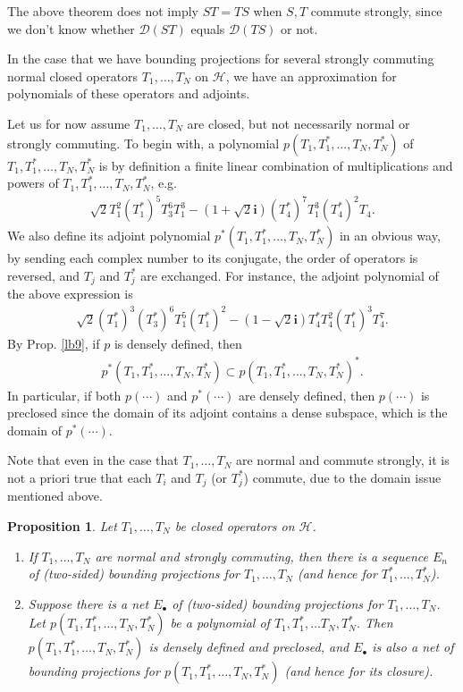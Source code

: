\documentclass[12pt,a4paper,notitlepage]{article}
\theoremstyle{definition}
\theoremstyle{plain}
\newtheorem{pp}[df]{Proposition}
\newcommand{\mc}{\mathcal}
\newcommand{\Dom}{\scr D}
\newcommand{\scr}{\mathscr}
\newcommand{\im}{\mathbf{i}}
\newcommand{\blt}{\bullet}
\numberwithin{equation}{section}
\begin{document}
The above theorem does not imply $ST=TS$ when $S,T$ commute strongly, since we don't know whether $\Dom(ST)$ equals $\Dom(TS)$ or not.







In the case that we have bounding projections for several strongly commuting normal closed operators $T_1,\dots,T_N$ on $\mc H$, we have an approximation for polynomials of these operators and adjoints. 

Let us for now assume $T_1,\dots,T_N$ are closed, but not necessarily normal or strongly commuting. To begin with, a polynomial $p(T_1,T_1^*,\dots,T_N,T_N^*)$ of $T_1,T_1^*,\dots,T_N,T_N^*$ is by definition a finite linear combination of multiplications and powers of  $T_1,T_1^*,\dots,T_N,T_N^*$, e.g.
\begin{align*}
\sqrt 2 T_1^2(T_1^*)^5T_3^6T_1^3-(1+\sqrt 2\im)(T_4^*)^7T_1^3(T_4^*)^2T_4.
\end{align*}
We also define its adjoint polynomial $p^*(T_1,T_1^*,\dots,T_N,T_N^*)$ in an obvious way, by sending each complex number to its conjugate, the order of operators is reversed, and $T_j$ and $T_j^*$ are exchanged. For instance, the adjoint polynomial of the above expression is 
\begin{align*}
\sqrt 2 (T_1^*)^3(T_3^*)^6T_1^5(T_1^*)^2-(1-\sqrt 2\im)T_4^*T_4^2(T_1^*)^3T_4^7.
\end{align*}
By Prop. \ref{lb9}, if $p$ is densely defined, then
\begin{align}
p^*(T_1,T_1^*,\dots,T_N,T_N^*)\subset p(T_1,T_1^*,\dots,T_N,T_N^*)^*.	\label{eq14}
\end{align}
In particular, if both $p(\cdots)$ and $p^*(\cdots)$ are densely defined, then $p(\cdots)$ is preclosed since the domain of its adjoint contains a dense subspace, which is the domain of $p^*(\cdots)$.


Note that even in the case that $T_1,\dots,T_N$ are normal and commute strongly, it is not a priori true that each $T_i$ and $T_j$ (or $T_j^*$) commute, due to the domain issue mentioned above.



\begin{pp}\label{lb43}
Let $T_1,\dots,T_N$ be closed operators on $\mc H$. 
\begin{enumerate}
\item  If $T_1,\dots,T_N$ are normal and strongly commuting, then there is a sequence $E_n$ of (two-sided) bounding projections for $T_1,\dots,T_N$ (and hence for $T_1^*,\dots,T_N^*$).
\item Suppose there is a net $E_\blt$ of (two-sided) bounding projections for $T_1,\dots,T_N$. Let $p(T_1,T_1^*,\dots,T_N,T_N^*)$ be a polynomial of $T_1,T_1^*,\dots T_N,T_N^*$. Then $p(T_1,T_1^*,\dots,T_N,T_N^*)$ is densely defined and preclosed, and $E_\blt$  is also a net of bounding projections for $p(T_1,T_1^*,\dots,T_N,T_N^*)$ (and hence for its closure).
\end{enumerate}
\end{pp}	
\end{document}
